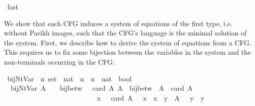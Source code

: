 \begin{isabellebody}
\ fast\isanewline
{}\isamarkupfalse%
%
\endisatagproof
{\isafoldproof}%
%
\isadelimproof
%
\endisadelimproof
%
\isadelimdocument
%
\endisadelimdocument
%
\isatagdocument
%
\isamarkuptrue%
%
\endisatagdocument
{\isafolddocument}%
%
\isadelimdocument
%
\endisadelimdocument
%
\begin{isamarkuptext}%
We show that each CFG induces a system of equations of the first type, i.e. without Parikh images,
such that the CFG's language is the minimal solution of the system. First, we describe how to derive
the system of equations from a CFG. This requires us to fix some bijection between the variables in
the system and the non-terminals occurring in the CFG:%
\end{isamarkuptext}\isamarkuptrue%
\isamarkupfalse%
\ bij{\isacharunderscore}{\kern0pt}Nt{\isacharunderscore}{\kern0pt}Var\ {\isacharcolon}{\kern0pt}{\isacharcolon}{\kern0pt}\ {\isachardoublequoteopen}{\isacharprime}{\kern0pt}n\ set\ {\isasymRightarrow}\ {\isacharparenleft}{\kern0pt}nat\ {\isasymRightarrow}\ {\isacharprime}{\kern0pt}n{\isacharparenright}{\kern0pt}\ {\isasymRightarrow}\ {\isacharparenleft}{\kern0pt}{\isacharprime}{\kern0pt}n\ {\isasymRightarrow}\ nat{\isacharparenright}{\kern0pt}\ {\isasymRightarrow}\ bool{\isachardoublequoteclose}\ \isanewline
\ \ {\isachardoublequoteopen}bij{\isacharunderscore}{\kern0pt}Nt{\isacharunderscore}{\kern0pt}Var\ A\ {\isasymgamma}\ {\isasymgamma}{\isacharprime}{\kern0pt}\ {\isasymequiv}\ bij{\isacharunderscore}{\kern0pt}betw\ {\isasymgamma}\ {\isacharbraceleft}{\kern0pt}{\isachardot}{\kern0pt}{\isachardot}{\kern0pt}{\isacharless}{\kern0pt}\ card\ A{\isacharbraceright}{\kern0pt}\ A\ {\isasymand}\ bij{\isacharunderscore}{\kern0pt}betw\ {\isasymgamma}{\isacharprime}{\kern0pt}\ A\ {\isacharbraceleft}{\kern0pt}{\isachardot}{\kern0pt}{\isachardot}{\kern0pt}{\isacharless}{\kern0pt}\ card\ A{\isacharbraceright}{\kern0pt}\isanewline
\ \ \ \ \ \ \ \ \ \ \ \ \ \ \ \ \ \ \ \ \ \ \ \ \ \ {\isasymand}\ {\isacharparenleft}{\kern0pt}{\isasymforall}x\ {\isasymin}\ {\isacharbraceleft}{\kern0pt}{\isachardot}{\kern0pt}{\isachardot}{\kern0pt}{\isacharless}{\kern0pt}\ card\ A{\isacharbraceright}{\kern0pt}{\isachardot}{\kern0pt}\ {\isasymgamma}{\isacharprime}{\kern0pt}\ {\isacharparenleft}{\kern0pt}{\isasymgamma}\ x{\isacharparenright}{\kern0pt}\ {\isacharequal}{\kern0pt}\ x{\isacharparenright}{\kern0pt}\ {\isasymand}\ {\isacharparenleft}{\kern0pt}{\isasymforall}y\ {\isasymin}\ A{\isachardot}{\kern0pt}\ {\isasymgamma}\ {\isacharparenleft}{\kern0pt}{\isasymgamma}{\isacharprime}{\kern0pt}\ y{\isacharparenright}{\kern0pt}\ {\isacharequal}{\kern0pt}\ y{\isacharparenright}{\kern0pt}{\isachardoublequoteclose}\isanewline

\end{isabellebody}
